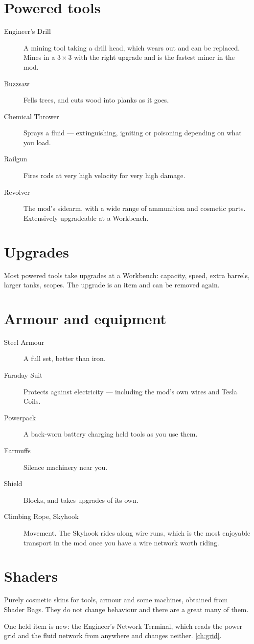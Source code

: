 \section{Powered tools}

\begin{description}
\item[Engineer's Drill] A mining tool taking a drill head, which wears out and can be replaced.
      Mines in a $3\times3$ with the right upgrade and is the fastest miner in the mod.
\item[Buzzsaw] Fells trees, and cuts wood into planks as it goes.
\item[Chemical Thrower] Sprays a fluid --- extinguishing, igniting or poisoning depending on what
      you load.
\item[Railgun] Fires rods at very high velocity for very high damage.
\item[Revolver] The mod's sidearm, with a wide range of ammunition and cosmetic parts. Extensively
      upgradeable at a Workbench.
\end{description}

\section{Upgrades}

Most powered tools take upgrades at a Workbench: capacity, speed, extra barrels, larger tanks,
scopes. The upgrade is an item and can be removed again.

\section{Armour and equipment}

\begin{description}
\item[Steel Armour] A full set, better than iron.
\item[Faraday Suit] Protects against electricity --- including the mod's own wires and Tesla Coils.
\item[Powerpack] A back-worn battery charging held tools as you use them.
\item[Earmuffs] Silence machinery near you.
\item[Shield] Blocks, and takes upgrades of its own.
\item[Climbing Rope, Skyhook] Movement. The Skyhook rides along wire runs, which is the most
      enjoyable transport in the mod once you have a wire network worth riding.
\end{description}

\section{Shaders}

Purely cosmetic skins for tools, armour and some machines, obtained from Shader Bags. They do not
change behaviour and there are a great many of them.

\begin{iefork}
One held item is new: the Engineer's Network Terminal, which reads the power grid and the fluid
network from anywhere and changes neither. \autoref{ch:grid}.
\end{iefork}
